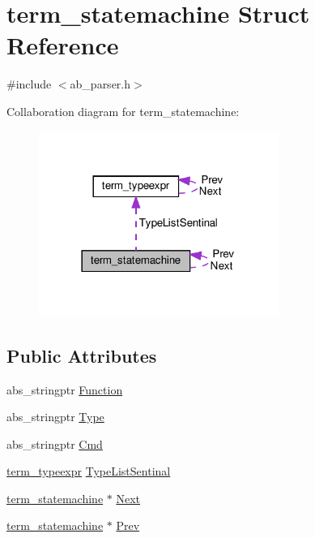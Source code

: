 \hypertarget{structterm__statemachine}{}\section{term\+\_\+statemachine Struct Reference}
\label{structterm__statemachine}


{\ttfamily \#include $<$ab\+\_\+parser.\+h$>$}



Collaboration diagram for term\+\_\+statemachine\+:
\nopagebreak
\begin{figure}[H]
\begin{center}
\leavevmode
\includegraphics[width=222pt]{de/d7c/structterm__statemachine__coll__graph}
\end{center}
\end{figure}
\subsection*{Public Attributes}
\begin{DoxyCompactItemize}
\item 
abs\+\_\+stringptr \hyperlink{structterm__statemachine_a75ae791ed373462f997aee5483d56e99}{Function}
\item 
abs\+\_\+stringptr \hyperlink{structterm__statemachine_abec84e1fd19f32bad850cbbfeb8c187c}{Type}
\item 
abs\+\_\+stringptr \hyperlink{structterm__statemachine_added4f585b848b366c3bac9c2d29a28b}{Cmd}
\item 
\hyperlink{structterm__typeexpr}{term\+\_\+typeexpr} \hyperlink{structterm__statemachine_ababd4f7bc69e5ca15fe95a56cdb312af}{Type\+List\+Sentinal}
\item 
\hyperlink{structterm__statemachine}{term\+\_\+statemachine} $\ast$ \hyperlink{structterm__statemachine_a78279e94d1a4f84463c5d7c4fba6bc17}{Next}
\item 
\hyperlink{structterm__statemachine}{term\+\_\+statemachine} $\ast$ \hyperlink{structterm__statemachine_a4e1ec651310e6e0789f9bcb627cfaa70}{Prev}
\end{DoxyCompactItemize}


